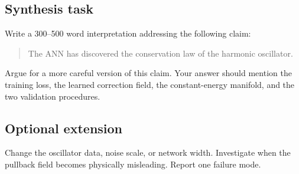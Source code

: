 \subsection*{Synthesis task}
Write a 300--500 word interpretation addressing the following claim:

\begin{quote}
The ANN has discovered the conservation law of the harmonic oscillator.
\end{quote}

Argue for a more careful version of this claim. Your answer should mention the training loss, the learned correction field, the constant-energy manifold, and the two validation procedures.

\subsection*{Optional extension}
Change the oscillator data, noise scale, or network width. Investigate when the pullback field becomes physically misleading. Report one failure mode.
